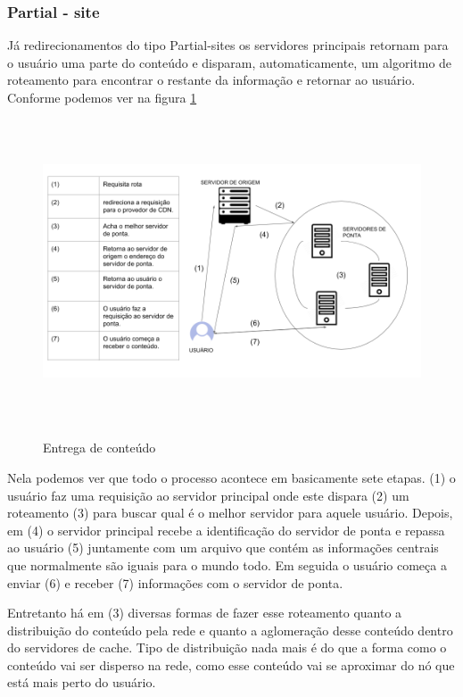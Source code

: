 \subsubsection{Partial - site}
J\'a redirecionamentos do tipo Partial-sites os servidores principais retornam para o usu\'ario uma parte do conte\'udo e disparam, automaticamente, um algoritmo de roteamento para encontrar o restante da informa\c{c}\~ao e retornar ao usu\'ario. Conforme podemos ver na figura \ref{figura:entrega_conteudo}
\begin{figure}[H]
\caption{Entrega de conte\'udo}
\includegraphics[height=9cm]{Figuras/entrega_conteudo.png} 
\label{figura:entrega_conteudo}
\end{figure}
Nela podemos ver que todo o processo acontece em basicamente sete etapas. (1) o usu\'ario faz uma requisi\c{c}\~ao ao servidor principal onde este dispara (2) um roteamento (3) para buscar qual \'e o melhor servidor para aquele usu\'ario. Depois, em (4) o servidor principal recebe a identifica\c{c}\~ao do servidor de ponta e repassa ao usu\'ario (5) juntamente com um arquivo que cont\'em as informa\c{c}\~oes centrais que normalmente s\~ao iguais para o mundo todo. Em seguida o usu\'ario come\c{c}a a enviar (6) e receber (7) informa\c{c}\~oes com o servidor de ponta.

 Entretanto h\'a em (3) diversas formas de fazer esse roteamento quanto a distribui\c{c}\~ao do conte\'udo pela rede e quanto a aglomera\c{c}\~ao desse conte\'udo dentro do servidores de cache. 
 Tipo de distribui\c{c}\~ao nada mais \'e do que a forma como o conte\'udo vai ser disperso na rede, como esse conte\'udo vai se aproximar do n\'o que est\'a mais perto do usu\'ario. 


